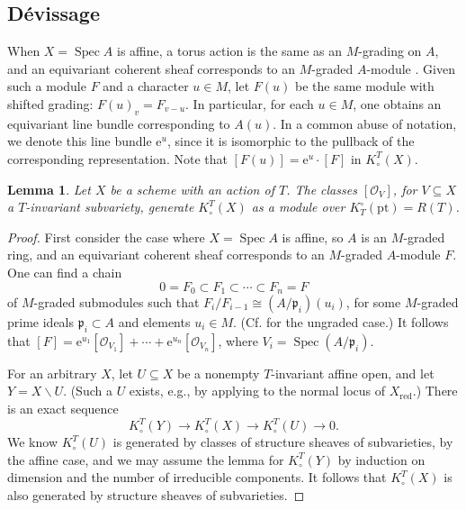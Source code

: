 \documentclass[11pt]{amsart}
\newtheorem{lemma}[theorem]{Lemma}
\theoremstyle{definition}
\begin{document}
\subsection{D\'evissage} 
When $X=\operatorname{Spec} A$ is affine, a torus action is the same as an $M$-grading on $A$, and an equivariant coherent sheaf corresponds to an $M$-graded $A$-module \cite[I.4.7.3]{sga3}.  Given such a module $F$ and a character $u\in M$, let $F(u)$ be the same module with shifted grading: $F(u)_v = F_{v-u}$.  In particular, for each $u\in M$, one obtains an equivariant line bundle corresponding to $A(u)$.  In a common abuse of notation, we denote this line bundle ${\mathrm{e}}^u$, since it is isomorphic to the pullback of the corresponding representation.  Note that $[F(u)] = {\mathrm{e}}^u\cdot[F]$ in $K_\circ^T(X)$.  

\begin{lemma}\label{l:devissage}
Let $X$ be a scheme with an action of $T$.  The classes $[{\mathcal{O}}_V]$, for $V\subseteq X$ a $T$-invariant subvariety, generate $K^T_\circ(X)$ as a module over $K_T^\circ({\mathrm{pt}}) = R(T)$.
\end{lemma}

\begin{proof}
First consider the case where $X=\operatorname{Spec} A$ is affine, so $A$ is an $M$-graded ring, and an equivariant coherent sheaf corresponds to an $M$-graded $A$-module $F$.  One can find a chain
\[
  0 = F_0 \subset F_1 \subset \cdots \subset F_n = F
\]
of $M$-graded submodules such that $F_i/F_{i-1} {\cong} (A/{\mathfrak{p}}_i)(u_i)$, for some $M$-graded prime ideals ${\mathfrak{p}}_i \subset A$ and elements $u_i \in M$.  (Cf. \cite[Ch.~IV, \S1, Th\'eor\`eme~1]{bourbaki} for the ungraded case.)  
It follows that $[F] = {\mathrm{e}}^{u_1}[{\mathcal{O}}_{V_1}]+\cdots+{\mathrm{e}}^{u_n}[{\mathcal{O}}_{V_n}]$, where $V_i = \operatorname{Spec}(A/{\mathfrak{p}}_i)$.

For an arbitrary $X$, let $U\subseteq X$ be a nonempty $T$-invariant affine open, and let $Y=X{\smallsetminus} U$.  (Such a $U$ exists, e.g., by applying \cite[Corollary~2]{sumihiro} to the normal locus of $X_{\mathrm{red}}$.)  There is an exact sequence
\begin{equation*}
  K^T_\circ(Y) \to K^T_\circ(X) \to K^T_\circ(U) \to 0.
\end{equation*}
We know $K^T_\circ(U)$ is generated by classes of structure sheaves of subvarieties, by the affine case, and we may assume the lemma for $K^T_\circ(Y)$ by induction on dimension and the number of irreducible components.  It follows that $K^T_\circ(X)$ is also generated by structure sheaves of subvarieties.
\end{proof}
\end{document}
